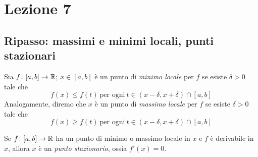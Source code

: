 \section{Lezione 7}
\subsection{Ripasso: massimi e minimi locali, punti stazionari}
\begin{definition}
    \label{def:7.1}
    Sia $f\colon[a,b]\to\amsbb{R}$; $x\in[a,b]$ è un punto di \emph{minimo locale} per $f$ se esiste $\delta>0$ tale che
    \[
    f(x)\le f(t) \ \text{per ogni} \ t\in(x-\delta, x+\delta)\cap [a,b]
    \]
    Analogamente, diremo che $x$ è un punto di \emph{massimo locale} per $f$ se esiste $\delta>0$ tale che
    \[
    f(x)\ge f(t) \ \text{per ogni} \ t\in(x-\delta, x+\delta)\cap [a,b]
    \]
\end{definition}
\begin{theorem}[di Fermat]
    \label{th:7.1}
    Se $f\colon [a,b]\to\amsbb{R}$ ha un punto di minimo o massimo locale in $x$ e $f$ è derivabile in $x$, allora $x$ è un \emph{punto stazionario}, ossia $f'(x) = 0$.
\end{theorem}
